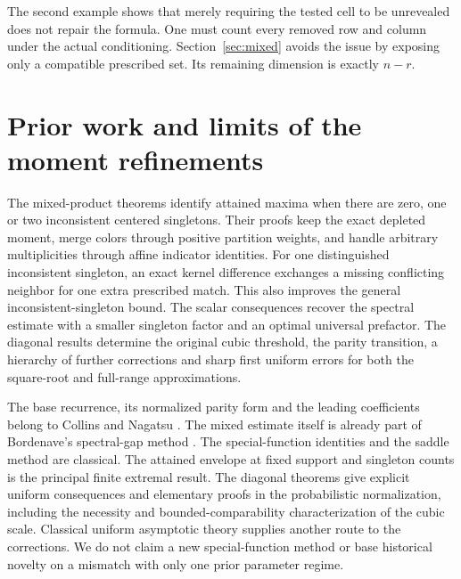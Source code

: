 \documentclass[11pt]{article}
\theoremstyle{definition}
\theoremstyle{remark}
\newcommand{\1}{\mathbf 1}
\begin{document}
The second example shows that merely requiring the tested cell to be unrevealed does not repair the formula. One must count every removed row and column under the actual conditioning. Section~\ref{sec:mixed} avoids the issue by exposing only a compatible prescribed set. Its remaining dimension is exactly $n-r$.


\clearpage
\section{Prior work and limits of the moment refinements}\label{sec:moment-discussion}

The mixed-product theorems identify attained maxima when there are zero, one or two inconsistent centered singletons. Their proofs keep the exact depleted moment, merge colors through positive partition weights, and handle arbitrary multiplicities through affine indicator identities. For one distinguished inconsistent singleton, an exact kernel difference exchanges a missing conflicting neighbor for one extra prescribed match. This also improves the general inconsistent-singleton bound. The scalar consequences recover the spectral estimate with a smaller singleton factor and an optimal universal prefactor. The diagonal results determine the original cubic threshold, the parity transition, a hierarchy of further corrections and sharp first uniform errors for both the square-root and full-range approximations.

The base recurrence, its normalized parity form and the leading coefficients belong to Collins and Nagatsu \cite{CN}. The mixed estimate itself is already part of Bordenave's spectral-gap method \cite{Bordenave}. The special-function identities and the saddle method are classical. The attained envelope at fixed support and singleton counts is the principal finite extremal result. The diagonal theorems give explicit uniform consequences and elementary proofs in the probabilistic normalization, including the necessity and bounded-comparability characterization of the cubic scale. Classical uniform asymptotic theory supplies another route to the corrections. We do not claim a new special-function method or base historical novelty on a mismatch with only one prior parameter regime.
\end{document}
